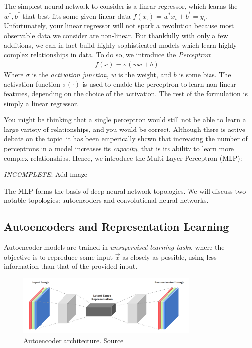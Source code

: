 \documentclass[paper=a4, fontsize=12pt]{scrartcl} %
\numberwithin{equation}{section} %
\numberwithin{figure}{section} %
\numberwithin{table}{section} %
\begin{document}
The simplest neural network to consider is a linear regressor, which learns the $w^*, b^*$ that best 
fits some given linear data $f(x_i) = w^* x_i + b^* = y_i$. Unfortunately, your linear regressor will not spark a revolution 
because most observable data we consider are non-linear. But thankfully with only a few additions, we can in fact build 
highly sophisticated models which learn highly complex relationships in data. To do so, we introduce the \textit{Perceptron}:
\begin{align*}
    f(x) = \sigma(wx + b)
\end{align*}
Where $\sigma$ is the \textit{activation function}, $w$ is the weight, and $b$ is some bias. The activation function $\sigma(\cdot)$ is used to
enable the perceptron to learn non-linear features, depending on the choice of the activation. The rest of the formulation is simply a linear 
regressor.

You might be thinking that a single perceptron would still not be able to learn a large variety of relationships, and you would be correct. Although there 
is active debate on the topic, it has been emperically shown that increasing the number of perceptrons in a model increases its \textit{capacity}\cite{vcdim}, that is 
its ability to learn more complex relationships. Hence, we introduce the Multi-Layer Perceptron (MLP):

\textit{INCOMPLETE}: Add image

The MLP forms the basis of deep neural network topologies. We will discuss two notable topologies: autoencoders and convolutional neural networks.

\pagebreak

\subsection{Autoencoders and Representation Learning}

Autoencoder models are trained in \textit{unsupervised learning tasks}, where the objective is to reproduce some input $\vec{x}$ as closely as possible, using less information
than that of the provided input.

\begin{figure}[H]
    \centering
    \includegraphics[width=0.8\textwidth]{images/autoencoder}
    \caption{Autoencoder architecture. \href{https://hackernoon.com/autoencoders-deep-learning-bits-1-11731e200694}{Source}}
\end{figure}
\end{document}

